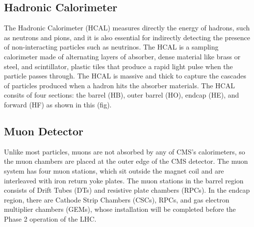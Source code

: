 \subsection{Hadronic Calorimeter}
The Hadronic Calorimeter (HCAL)%
 measures directly the energy of hadrons, such as neutrons and pions, and it is also essential for indirectly detecting the presence of non-interacting particles such as neutrinos.
The HCAL is a sampling calorimeter made of alternating layers of absorber, dense material like brass or steel, and scintillator, plastic tiles that produce a rapid light pulse when the particle passes through.
The HCAL is massive and thick to capture the cascades of particles produced when a hadron hits the absorber materials.
The HCAL consits of four sections: the barrel (HB), outer barrel (HO), endcap (HE), and forward (HF) as shown in this (fig).

\subsection{Muon Detector}
Unlike most particles, muons are not absorbed by any of CMS’s calorimeters, so the muon chambers are placed at the outer edge of the CMS detector.
The muon system%
has four muon stations, which sit outside the magnet coil and are interleaved with iron return yoke plates.%
 The muon stations in the barrel region consists of Drift Tubes (DTs) and resistive plate chambers (RPCs).
In the endcap region, there are Cathode Strip Chambers (CSCs), RPCs, and gas electron multiplier chambers (GEMs), whose installation will be completed before the Phase 2 operation of the LHC.%

